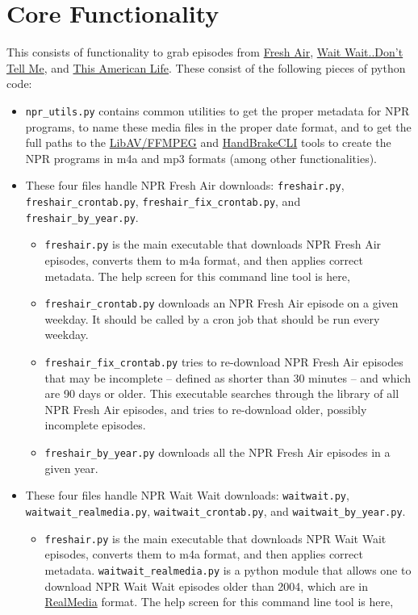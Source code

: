 \documentclass[]{article}
\begin{document}
\section{Core Functionality}\label{sec:core_functionality}
This consists of functionality to grab episodes from \href{http://www.npr.org/programs/fresh-air/}{Fresh Air},  \href{http://www.npr.org/programs/wait-wait-dont-tell-me/}{Wait Wait..Don't Tell Me}, and \href{http://www.thisamericanlife.org/}{This American Life}. These consist of the following pieces of python code:
\begin{itemize}
  \item {\verb|npr_utils.py|} contains common utilities to get the proper metadata for NPR programs, to name these media files in the proper date format, and to get the full paths to the \href{https://libav.org}{LibAV/FFMPEG} and \href{https://handbrake.fr/}{HandBrakeCLI} tools to create the NPR programs in m4a and mp3 formats (among other functionalities).
  
  \item These four files handle NPR Fresh Air downloads: {\verb|freshair.py|}, {\verb|freshair_crontab.py|}, {\verb|freshair_fix_crontab.py|}, and {\verb|freshair_by_year.py|}.
  \begin{itemize}
    \item {\verb|freshair.py|} is the main executable that downloads NPR Fresh Air episodes, converts them to m4a format, and then applies correct metadata. The help screen for this command line tool is here,
    
    
    \item {\verb|freshair_crontab.py|} downloads an NPR Fresh Air episode on a given weekday. It should be called by a cron job that should be run every weekday.
    
    \item {\verb|freshair_fix_crontab.py|} tries to re-download NPR Fresh Air episodes that may be incomplete -- defined as shorter than 30 minutes -- and which are 90 days or older. This executable searches through the library of all NPR Fresh Air episodes, and tries to re-download older, possibly incomplete episodes.
    
    \item {\verb|freshair_by_year.py|} downloads all the NPR Fresh Air episodes in a given year.
  \end{itemize}
  
  \item These four files handle NPR Wait Wait downloads: {\verb|waitwait.py|}, {\verb|waitwait_realmedia.py|}, {\verb|waitwait_crontab.py|}, and {\verb|waitwait_by_year.py|}.
  \begin{itemize}
   \item {\verb|freshair.py|} is the main executable that downloads NPR Wait Wait episodes, converts them to m4a format, and then applies correct metadata. {\verb|waitwait_realmedia.py|} is a python module that allows one to download NPR Wait Wait episodes older than 2004, which are in \href{https://en.wikipedia.org/wiki/RealMedia}{RealMedia} format. The help screen for this command line tool is here,
   
   

\end{itemize}
\end{itemize}
\end{document}
